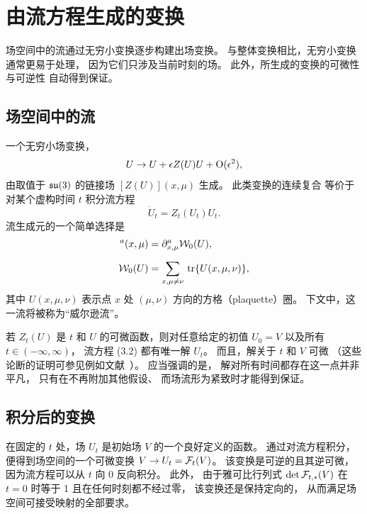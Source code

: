\section{由流方程生成的变换}

场空间中的流通过无穷小变换逐步构建出场变换。
与整体变换相比，无穷小变换通常更易于处理，
因为它们只涉及当前时刻的场。
此外，所生成的变换的可微性与可逆性
自动得到保证。


\subsection{场空间中的流}

一个无穷小场变换，
\begin{equation}
  U\to U+\epsilon Z(U)U+\mathrm{O}(\epsilon^2),
\end{equation}
由取值于 $\mathfrak{su}(3)$ 的链接场 $[Z(U)](x,\mu)$ 生成。
此类变换的连续复合
等价于对某个虚构时间 $t$ 积分流方程
\begin{equation}
  \dot{U}_t=Z_t(U_t)U_t.
\end{equation}
流生成元的一个简单选择是
\begin{align}
  [Z_t(U)]^a(x,\mu)&=\du^a_{x,\mu}\Wl_0(U),
  \\[1.5ex]
  \Wl_0(U)&=\sum_{x,\mu\neq\nu}\,\tr\{U(x,\mu,\nu)\},
\end{align}
其中 $U(x,\mu,\nu)$ 表示点 $x$ 处 $(\mu,\nu)$ 方向的方格（plaquette）圈。
下文中，这一流将被称为``威尔逊流''。

若 $Z_t(U)$ 是 $t$ 和 $U$ 的可微函数，则对任意给定的初值 $U_0=V$
以及所有 $t\in(-\infty,\infty)$，
流方程 (3.2) 都有唯一解 $U_t$。
而且，解关于 $t$ 和 $V$ 可微
（这些论断的证明可参见例如文献~\cite{ArnoldI}）。
应当强调的是，
解对所有时间都存在这一点并非平凡，
只有在不再附加其他假设、
而场流形为紧致时才能得到保证。


\subsection{积分后的变换}

在固定的 $t$ 处，场 $U_t$ 是初始场 $V$ 的一个良好定义的函数。
通过对流方程积分，便得到场空间的一个可微变换
$V\to U_t=\mathcal{F}_{t}(V)$。
该变换是可逆的且其逆可微，
因为流方程可以从 $t$ 向 0 反向积分。
此外，
由于雅可比行列式 $\det\mathcal{F}_{t,*}(V)$
在 $t=0$ 时等于 1 且在任何时刻都不经过零，
该变换还是保持定向的，
从而满足场空间可接受映射的全部要求。

